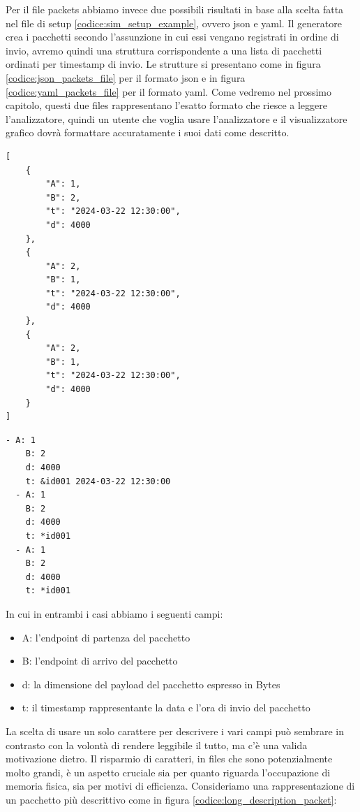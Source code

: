 \documentclass[binding=0.6cm]{sapthesis}
\begin{document}
Per il file packets abbiamo invece due possibili risultati in base alla scelta fatta nel file di setup \ref{codice:sim_setup_example}, ovvero json e yaml.
Il generatore crea i pacchetti secondo l'assunzione in cui essi vengano registrati in ordine di invio, avremo quindi una struttura corrispondente
a una lista di pacchetti ordinati per timestamp di invio.
Le strutture si presentano come in figura \ref{codice:json_packets_file} per il formato json e in figura \ref{codice:yaml_packets_file} per il formato yaml.
Come vedremo nel prossimo capitolo, questi due files rappresentano l'esatto formato che riesce a leggere l'analizzatore, quindi un utente
che voglia usare l'analizzatore e il visualizzatore grafico dovrà formattare accuratamente i suoi dati come descritto.

{\scriptsize %
\begin{lstlisting}[caption={esempio di packets file in formato json}, label={codice:json_packets_file}]
[
    {
        "A": 1,
        "B": 2,
        "t": "2024-03-22 12:30:00",
        "d": 4000
    },
    {
        "A": 2,
        "B": 1,
        "t": "2024-03-22 12:30:00",
        "d": 4000
    },
    {
        "A": 2,
        "B": 1,
        "t": "2024-03-22 12:30:00",
        "d": 4000
    }
]
\end{lstlisting}
}

{\scriptsize %
\begin{lstlisting}[caption={esempio di packets file in formato yaml}, label={codice:yaml_packets_file}]
  - A: 1
    B: 2
    d: 4000
    t: &id001 2024-03-22 12:30:00
  - A: 1
    B: 2
    d: 4000
    t: *id001
  - A: 1
    B: 2
    d: 4000
    t: *id001
\end{lstlisting}
}

In cui in entrambi i casi abbiamo i seguenti campi:
\begin{itemize}
    \item A: l'endpoint di partenza del pacchetto
    \item B: l'endpoint di arrivo del pacchetto
    \item d: la dimensione del payload del pacchetto espresso in Bytes
    \item t: il timestamp rappresentante la data e l'ora di invio del pacchetto
\end{itemize}
La scelta di usare un solo carattere per descrivere i vari campi può sembrare in contrasto con la volontà di rendere leggibile il tutto,
ma c'è una valida motivazione dietro. Il risparmio di caratteri, in files che sono potenzialmente molto grandi, è un aspetto cruciale sia per quanto
riguarda l'occupazione di memoria fisica, sia per motivi di efficienza. Consideriamo una rappresentazione di un pacchetto più descrittivo come in figura \ref{codice:long_description_packet}:
\end{document}
